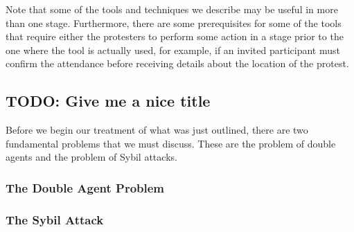 Note that some of the tools and techniques we describe may be useful in more than 
one stage. Furthermore, there are some prerequisites for some of the tools that 
require either the protesters to perform some action in a stage prior to the one 
where the tool is actually used, for example, if an invited participant must confirm 
the attendance before receiving details about the location of the protest.

\subsection{TODO: Give me a nice title}
Before we begin our treatment of what was just outlined, there are two 
fundamental problems that we must discuss.
These are the problem of double agents and the problem of Sybil attacks.

\subsubsection{The Double Agent Problem}
\label{DoubleAgentProblem}



\subsubsection{The Sybil Attack}
\label{SybilAttacks}



